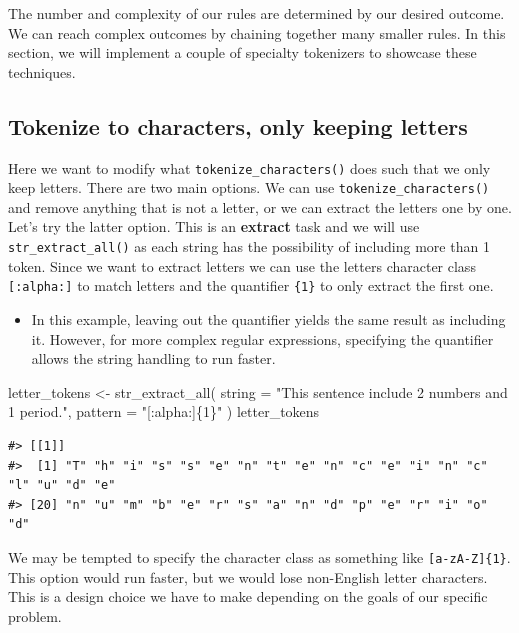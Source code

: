 \documentclass[
]{krantz}
\makeatletter
\newenvironment{Shaded}{\begin{snugshade}}{\end{snugshade}}
\newcommand{\AttributeTok}[1]{\textcolor[rgb]{0.77,0.63,0.00}{#1}}
\newcommand{\FunctionTok}[1]{\textcolor[rgb]{0.00,0.00,0.00}{#1}}
\newcommand{\NormalTok}[1]{#1}
\newcommand{\OtherTok}[1]{\textcolor[rgb]{0.56,0.35,0.01}{#1}}
\newcommand{\StringTok}[1]{\textcolor[rgb]{0.31,0.60,0.02}{#1}}
\newenvironment{kframe}{%
\medskip{}
\setlength{\fboxsep}{.8em}
 \def\at@end@of@kframe{}%
 \ifinner\ifhmode%
  \def\at@end@of@kframe{\end{minipage}}%
  \begin{minipage}{\columnwidth}%
 \fi\fi%
 \def\FrameCommand##1{\hskip\@totalleftmargin \hskip-\fboxsep
 \colorbox{shadecolor}{##1}\hskip-\fboxsep
     \hskip-\linewidth \hskip-\@totalleftmargin \hskip\columnwidth}%
 \MakeFramed {\advance\hsize-\width
   \@totalleftmargin\z@ \linewidth\hsize
   \@setminipage}}%
 {\par\unskip\endMakeFramed%
 \at@end@of@kframe}
\renewenvironment{Shaded}{\begin{kframe}}{\end{kframe}}
\newenvironment{rmdblock}[1]
  {\begin{shaded*}
  \begin{itemize}[left = -1cm, labelsep = 1cm]
  \renewcommand{\labelitemi}{
    \raisebox{-.7\height}[0pt][0pt]{
      {\setkeys{Gin}{width=3em,keepaspectratio}\texttt{[image: images/\#1]}}
    }
  }
 
  \item
  }
  {
  \end{itemize}
  \end{shaded*}
  }
\newenvironment{rmdnote}
  {\begin{rmdblock}{note}}
  {\end{rmdblock}}
\makeatother
\begin{document}
The number and complexity of our rules are determined by our desired outcome. We can reach complex outcomes by chaining together many smaller rules. In this section, we will implement a couple of specialty tokenizers to showcase these techniques.

\hypertarget{tokenize-to-characters-only-keeping-letters}{%
\subsection{Tokenize to characters, only keeping letters}\label{tokenize-to-characters-only-keeping-letters}}

Here we want to modify what \texttt{tokenize\_characters()} does such that we only keep letters. There are two main options. We can use \texttt{tokenize\_characters()} and remove anything that is not a letter, or we can extract the letters one by one. Let's try the latter option. This is an \textbf{extract} task and we will use \texttt{str\_extract\_all()} as each string has the possibility of including more than 1 token. Since we want to extract letters we can use the letters character class \texttt{{[}:alpha:{]}} to match letters and the quantifier \texttt{\{1\}} to only extract the first one.

\begin{rmdnote}
In this example, leaving out the quantifier yields the same result as
including it. However, for more complex regular expressions, specifying
the quantifier allows the string handling to run faster.
\end{rmdnote}

\begin{Shaded}
\begin{Highlighting}[]
\NormalTok{letter\_tokens }\OtherTok{\textless{}{-}} \FunctionTok{str\_extract\_all}\NormalTok{(}
  \AttributeTok{string =} \StringTok{"This sentence include 2 numbers and 1 period."}\NormalTok{,}
  \AttributeTok{pattern =} \StringTok{"[:alpha:]\{1\}"}
\NormalTok{)}
\NormalTok{letter\_tokens}
\end{Highlighting}
\end{Shaded}

\begin{verbatim}
#> [[1]]
#>  [1] "T" "h" "i" "s" "s" "e" "n" "t" "e" "n" "c" "e" "i" "n" "c" "l" "u" "d" "e"
#> [20] "n" "u" "m" "b" "e" "r" "s" "a" "n" "d" "p" "e" "r" "i" "o" "d"
\end{verbatim}

We may be tempted to specify the character class as something like \texttt{{[}a-zA-Z{]}\{1\}}. This option would run faster, but we would lose non-English letter characters. This is a design choice we have to make depending on the goals of our specific problem.
\end{document}
